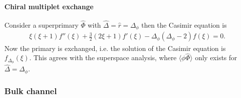 \documentclass[letterpaper]{article}
\let\Oldsubsubsection\subsubsection
\renewcommand{\subsubsection}{\FloatBarrier\Oldsubsubsection}
\begin{document}
\paragraph{Chiral multiplet exchange}

Consider a superprimary $\hat \Phi$ with $\hat \Delta = \hat r = \Delta_\phi$ then the Casimir equation is
\begin{align}
 \xi  (\xi +1) f''(\xi )+\frac{3}{2} (2 \xi +1) f'(\xi )
 - \Delta_\phi \left( \Delta_\phi - 2 \right) f(\xi ) = 0.
\end{align}
Now the primary is exchanged, i.e. the solution of the Casimir equation is $f_{\Delta_\phi}(\xi)$.
This agrees with the superspace analysis, where $\langle \phi \hat \Phi \rangle$ only exists for $\hat \Delta = \Delta_\phi$.

\subsubsection{Bulk channel}
\end{document}
